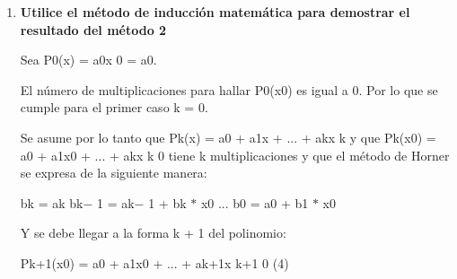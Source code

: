 \documentclass[12pt]{article}
\renewcommand{\_}{\kern-1.5pt\textunderscore\kern-1.5pt}
\begin{document}
\begin{enumerate}
	\item {\fontsize{10pt}{12.0pt}\selectfont \textbf{Utilice el método de inducción matemática para demostrar el resultado del método 2}\par}\par


\vspace{\baselineskip}
\setlength{\parskip}{8.04pt}
\setlength{\parskip}{0.0pt}
\begin{Center}
{\fontsize{10pt}{12.0pt}\selectfont Sea P0(x) = a0x 0 = a0.\par}
\end{Center}\par

\begin{justify}
{\fontsize{10pt}{12.0pt}\selectfont El número de multiplicaciones para hallar P0(x0) es igual a 0. Por lo que se cumple para el primer caso k = 0.\par}
\end{justify}\par

\begin{justify}
{\fontsize{10pt}{12.0pt}\selectfont  Se asume por lo tanto que Pk(x) = a0 + a1x + ... + akx k y que Pk(x0) = a0 + a1x0 + ... + akx k 0 tiene k multiplicaciones y que el método de Horner se expresa de la siguiente manera: \par}
\end{justify}\par


\vspace{\baselineskip}
\setlength{\parskip}{8.04pt}
\setlength{\parskip}{0.0pt}
\begin{Center}
{\fontsize{10pt}{12.0pt} bk = ak bk$-$ 1 = ak$-$ 1 + bk $\ast$  x0 ... b0 = a0 + b1 $\ast$  x0 \par}
\end{Center}\par

\begin{justify}
{\fontsize{10pt}{12.0pt}\selectfont Y se debe llegar a la forma k + 1 del polinomio:\par}
\end{justify}\par

\begin{Center}
{\fontsize{10pt}{12.0pt}\selectfont  Pk+1(x0) = a0 + a1x0 + ... + ak+1x k+1 0 (4) \par}
\end{Center}\par


\end{enumerate}
\end{document}
